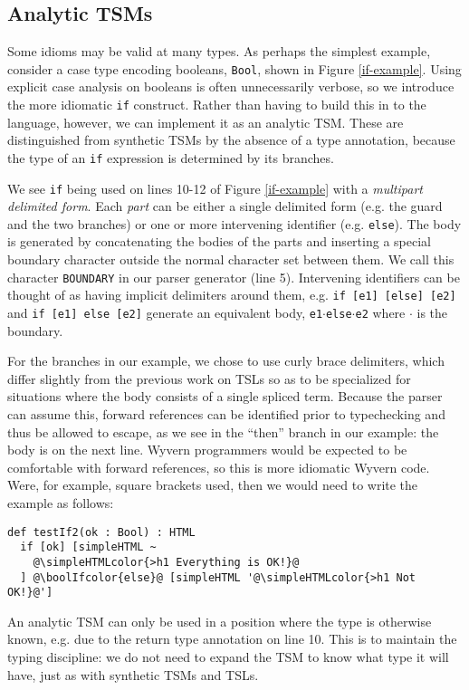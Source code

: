 \documentclass{sig-alternate}[10pt]
\newcommand{\simpleHTMLcolor}[1]{\textcolor[HTML]{7D5100}{#1}}
\newcommand{\boolIfcolor}[1]{\textcolor[HTML]{5E0C0C}{#1}}
\begin{document}
\subsection{Analytic TSMs}
Some idioms may be valid at many types. As perhaps the simplest example, consider a case type encoding booleans, \verb|Bool|, shown in Figure \ref{if-example}. Using explicit case analysis on booleans is often unnecessarily verbose, so we introduce the more idiomatic \verb|if| construct. Rather than having to build this in to the language, however, we can implement it as an analytic TSM. These are distinguished from synthetic TSMs by the absence of a type annotation, because the type of an \verb|if| expression is determined by its branches. 

We see \verb|if| being used on lines 10-12 of Figure \ref{if-example} with a \emph{multipart delimited form}. Each \emph{part} can be either a single delimited form (e.g. the guard and the two branches) or one or more intervening identifier (e.g. \verb|else|). The body is generated by concatenating the bodies of the parts and inserting a special boundary character outside the normal character set between them. We call this character \verb|BOUNDARY| in our parser generator (line 5). Intervening identifiers can be thought of as having implicit delimiters around them, e.g. \verb|if [e1] [else] [e2]| and \verb|if [e1] else [e2]| generate an equivalent body, \texttt{e1}$\cdot$\verb|else|$\cdot$\verb|e2| where $\cdot$ is the boundary.

For the branches in our example, we chose to use curly brace delimiters, which  differ slightly from the previous work on TSLs so as to be specialized for situations where the body consists of a single spliced term. Because the parser can assume this, forward references can be identified prior to typechecking and thus be allowed to escape, as we see in the ``then'' branch in our example: the body is on the next line. Wyvern programmers would be expected to be comfortable with forward references, so this is more idiomatic Wyvern code. Were, for example, square brackets used, then we would need to write the example as follows:

\begin{lstlisting}[style=wyvern]
def testIf2(ok : Bool) : HTML
  if [ok] [simpleHTML ~
    @\simpleHTMLcolor{>h1 Everything is OK!}@
  ] @\boolIfcolor{else}@ [simpleHTML '@\simpleHTMLcolor{>h1 Not OK!}@']
\end{lstlisting}

An analytic TSM can only be used in a position where the type is otherwise known, e.g. due to the return type annotation on line 10. This is to maintain the typing discipline: we do not need to expand the TSM to know what type it will have, just as with synthetic TSMs and TSLs. 
\end{document}
